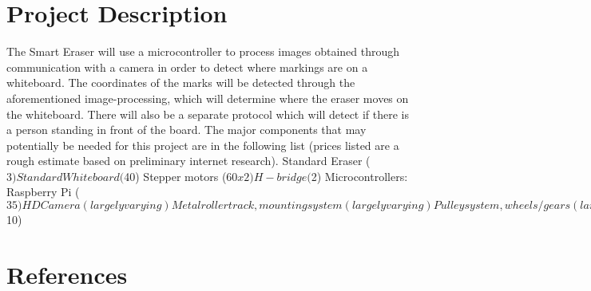 \documentclass{IEEEtran}					%
\begin{document}
	\section{Project Description}
	The Smart Eraser will use a microcontroller to process images obtained through communication with a camera in order to detect where markings are on a whiteboard. The coordinates of the marks will be detected through the aforementioned image-processing, which will determine where the eraser moves on the whiteboard. There will also be a separate protocol which will detect if there is a person standing in front of the board. The major components that may potentially be needed for this project are in the following list (prices listed are a rough estimate based on preliminary internet research).
Standard Eraser ($3)
Standard Whiteboard ($40)
Stepper motors ($60 x2)
H-bridge ($2)
Microcontrollers: Raspberry Pi ($35)
HD Camera (largely varying)
Metal roller track, mounting system (largely varying)
Pulley system, wheels/gears (largely varying)
Various wires and connections ($10)

	
	\section*{References}
\end{document}
